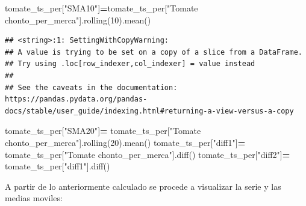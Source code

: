 \documentclass[
]{book}
\newenvironment{Shaded}{\begin{snugshade}}{\end{snugshade}}
\newcommand{\DecValTok}[1]{\textcolor[rgb]{0.00,0.00,0.81}{#1}}
\newcommand{\NormalTok}[1]{#1}
\newcommand{\OperatorTok}[1]{\textcolor[rgb]{0.81,0.36,0.00}{\textbf{#1}}}
\newcommand{\StringTok}[1]{\textcolor[rgb]{0.31,0.60,0.02}{#1}}
\begin{document}
\begin{Shaded}
\begin{Highlighting}[]
\NormalTok{tomate\_ts\_per[}\StringTok{"SMA10"}\NormalTok{]}\OperatorTok{=}\NormalTok{tomate\_ts\_per[}\StringTok{"Tomate chonto\_per\_merca"}\NormalTok{].rolling(}\DecValTok{10}\NormalTok{).mean()}
\end{Highlighting}
\end{Shaded}

\begin{verbatim}
## <string>:1: SettingWithCopyWarning: 
## A value is trying to be set on a copy of a slice from a DataFrame.
## Try using .loc[row_indexer,col_indexer] = value instead
## 
## See the caveats in the documentation: https://pandas.pydata.org/pandas-docs/stable/user_guide/indexing.html#returning-a-view-versus-a-copy
\end{verbatim}

\begin{Shaded}
\begin{Highlighting}[]
\NormalTok{tomate\_ts\_per[}\StringTok{"SMA20"}\NormalTok{]}\OperatorTok{=}\NormalTok{ tomate\_ts\_per[}\StringTok{"Tomate chonto\_per\_merca"}\NormalTok{].rolling(}\DecValTok{20}\NormalTok{).mean()}
\NormalTok{tomate\_ts\_per[}\StringTok{"diff1"}\NormalTok{]}\OperatorTok{=}\NormalTok{ tomate\_ts\_per[}\StringTok{"Tomate chonto\_per\_merca"}\NormalTok{].diff()}
\NormalTok{tomate\_ts\_per[}\StringTok{"diff2"}\NormalTok{]}\OperatorTok{=}\NormalTok{ tomate\_ts\_per[}\StringTok{"diff1"}\NormalTok{].diff()}
\end{Highlighting}
\end{Shaded}

A partir de lo anteriormente calculado se procede a visualizar la serie y las medias moviles:
\end{document}
